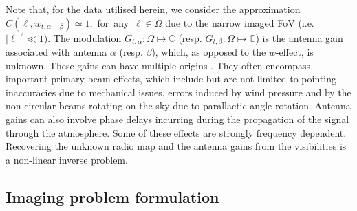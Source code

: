 \documentclass[fleqn,usenatbib]{mnras}
\newcommand{\ds}{\displaystyle}
\newcommand{\lb}{\ensuremath{\boldsymbol{\ell}}}
\newcommand{\eC}{\mathbb{C}}
\begin{document}
Note that, for the data utilised herein, we consider the approximation ${\ds C}(\lb, w_{{{t}},\alpha-\beta}) \simeq 1$,{~for~any~}${\lb}\in \Omega$ due to the narrow imaged FoV (i.e. $\vert {\lb} \vert^2\ll 1$). The modulation $\ds{G}_{t,\alpha}:\Omega \mapsto \eC$ (resp. $\ds{G}_{t,\beta}:\Omega \mapsto \eC$) is the antenna gain associated with antenna $\alpha$ (resp. $\beta$), which, as opposed to the $w$-effect, is unknown. These gains can have multiple origins \citep{Smirnov2011}. They often encompass important primary beam effects, which include but are not limited to pointing inaccuracies due to mechanical issues, errors induced by wind pressure and by the non-circular beams rotating on the sky due to parallactic angle rotation. Antenna gains can also involve phase delays incurring during the propagation of the signal through the atmosphere. Some of these effects are strongly frequency dependent.
Recovering the unknown radio map and the antenna gains from the visibilities is a non-linear inverse problem.
\subsection{Imaging problem formulation}\label{ssec:impbf}
\end{document}
